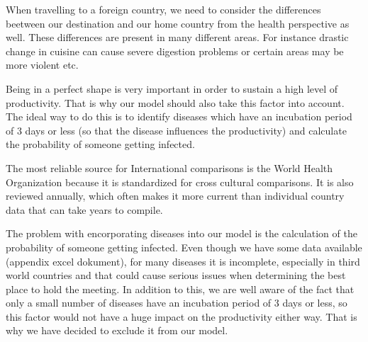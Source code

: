 
When travelling to a foreign country, we need to consider the differences beetween our destination and our home country from the health perspective as well. These differences are present in many different areas. For instance drastic change in cuisine can cause severe digestion problems or certain areas may be more violent etc. 

Being in a perfect shape is very important in order to sustain a high level of productivity. That is why our model should also take this factor into account. The ideal way to do this is to identify diseases which have an incubation period of 3 days or less (so that the disease influences the productivity) and calculate the probability of someone getting infected.

The most reliable source for International comparisons is the World Health Organization because it is standardized for cross cultural comparisons. It is also reviewed annually, which often makes it more current than individual country data that can take years to compile.

The problem with encorporating diseases into our model is the calculation of the probability of someone getting infected. Even though we have some data available (appendix excel dokument), for many diseases it is incomplete, especially in third world countries and that could cause serious issues when determining the best place to hold the meeting. In addition to this, we are well aware of the fact that only a small number of diseases have an incubation period of 3 days or less, so this factor would not have a huge impact on the productivity either way. That is why we have decided to exclude it from our model.